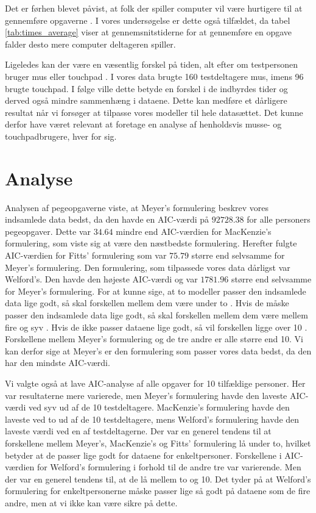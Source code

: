 Det er førhen blevet påvist, at folk der spiller computer vil være hurtigere til at gennemføre opgaverne \cite{wyeld2013}. I vores undersøgelse er dette også tilfældet, da tabel \ref{tab:times_average} viser at gennemsnitstiderne for at gennemføre en opgave falder desto mere computer deltageren spiller.

Ligeledes kan der være en væsentlig forskel på tiden, alt efter om testpersonen bruger mus eller touchpad \cite{epps1986}. I vores data brugte 160 testdeltagere mus, imens 96 brugte touchpad. I følge \cite{epps1986} ville dette betyde en forskel i de indbyrdes tider og derved også mindre sammenhæng i dataene. Dette kan medføre et dårligere resultat når vi forsøger at tilpasse vores modeller til hele datasættet. Det kunne derfor have været relevant at foretage en analyse af henholdsvis musse- og touchpadbrugere, hver for sig.

\section*{Analyse}
Analysen af pegeopgaverne viste, at Meyer's formulering beskrev vores indsamlede data bedst, da den havde en AIC-værdi på $92728.38$ for alle personers pegeopgaver. Dette var $34.64$ mindre end AIC-værdien for MacKenzie's formulering, som viste sig at være den næstbedste formulering. Herefter fulgte AIC-værdien for Fitts' formulering som var $75.79$ større end selvsamme for Meyer's formulering. Den formulering, som tilpassede vores data dårligst var Welford's. Den havde den højeste AIC-værdi og var $1781.96$ større end selvsamme for Meyer's formulering. For at kunne sige, at to modeller passer den indsamlede data lige godt, så skal forskellen mellem dem være under to \cite{burnham2004}. Hvis de måske passer den indsamlede data lige godt, så skal forskellen mellem dem være mellem fire og syv \cite{burnham2004}. Hvis de ikke passer dataene lige godt, så vil forskellen ligge over 10 \cite{burnham2004}. Forskellene mellem Meyer's formulering og de tre andre er alle større end 10. Vi kan derfor sige at Meyer's er den formulering som passer vores data bedst, da den har den mindste AIC-værdi.

Vi valgte også at lave AIC-analyse af alle opgaver for 10 tilfældige personer. Her var resultaterne mere varierede, men Meyer's formulering havde den laveste AIC-værdi ved syv ud af de 10 testdeltagere. MacKenzie's formulering havde den laveste ved to ud af de 10 testdeltagere, mens Welford's formulering havde den laveste værdi ved en af testdeltagerne. Der var en generel tendens til at forskellene mellem Meyer's, MacKenzie's og Fitts' formulering lå under to, hvilket betyder at de passer lige godt for dataene for enkeltpersoner. Forskellene i AIC-værdien for Welford's formulering i forhold til de andre tre var varierende. Men der var en generel tendens til, at de lå mellem to og 10. Det tyder på at Welford's formulering for enkeltpersonerne måske passer lige så godt på dataene som de fire andre, men at vi ikke kan være sikre på dette.

